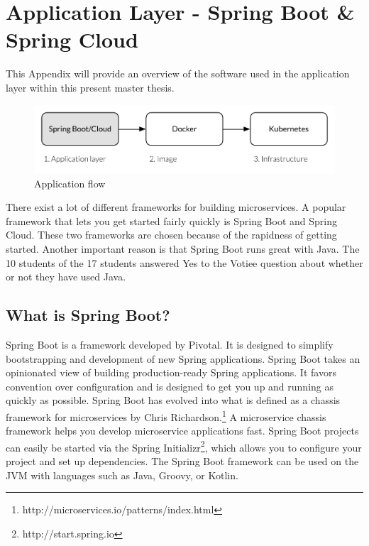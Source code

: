 \chapter{Application Layer - Spring Boot \& Spring Cloud}
\label{appendix:application_layer}

This Appendix will provide an overview of the software used in the application layer within this present master thesis. 

\begin{figure}[H]
	\centering
	\includegraphics[width=12cm]{figures/technology_flow_spring}
	\caption{Application flow}
	\label{fig:flow_spring}
\end{figure}

\noindent There exist a lot of different frameworks for building microservices. A popular framework that lets you get started fairly quickly is Spring Boot and Spring Cloud. These two frameworks are chosen because of the rapidness of getting started. Another important reason is that Spring Boot runs great with Java. The 10 students of the 17 students answered Yes to the Votiee question about whether or not they have used Java.

\section*{What is Spring Boot?}

Spring Boot is a framework developed by Pivotal. It is designed to simplify bootstrapping and development of new Spring applications. Spring Boot takes an opinionated view of building production-ready Spring applications. It favors convention over configuration and is designed to get you up and running as quickly as possible. Spring Boot has evolved into what is defined as a chassis framework for microservices by Chris Richardson.\footnote{http://microservices.io/patterns/index.html} A microservice chassis framework helps you develop microservice applications fast. Spring Boot projects can easily be started via the Spring Initializr\footnote{http://start.spring.io}, which allows you to configure your project and set up dependencies. The Spring Boot framework can be used on the JVM with languages such as Java, Groovy, or Kotlin. 

